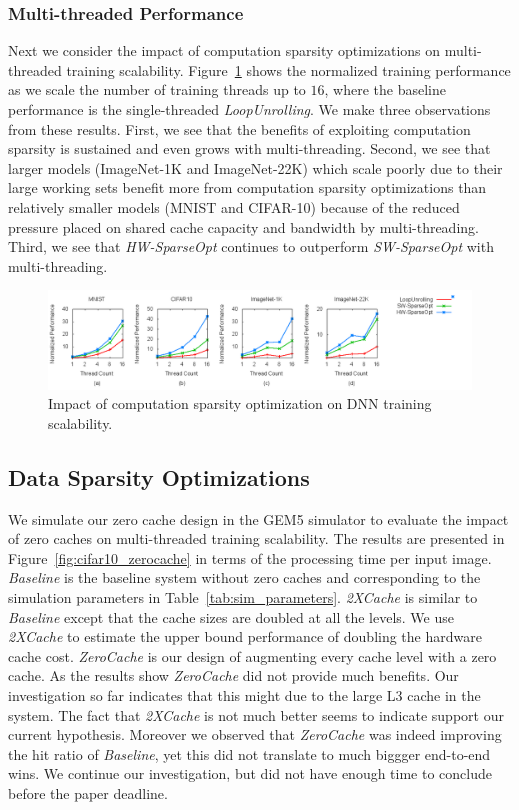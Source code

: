 \subsubsection{Multi-threaded Performance}
Next we consider the impact of computation sparsity optimizations on multi-threaded training scalability.  Figure~\ref{fig:compute_scaling} shows the normalized training performance as we scale the number of training threads up to $16$, where the baseline performance is the single-threaded {\it LoopUnrolling}.   We make three observations from these results.  First, we see that the benefits of exploiting computation sparsity is sustained and even grows with multi-threading.  Second, we see that larger models (ImageNet-1K and ImageNet-22K) which scale poorly due to their large working sets benefit more from computation sparsity optimizations than relatively smaller models (MNIST and CIFAR-10) because of the reduced pressure placed on shared cache capacity and bandwidth by multi-threading.  Third, we see that {\it HW-SparseOpt} continues to outperform {\it SW-SparseOpt} with multi-threading. 

 \begin{figure}
 \centering
 \includegraphics[width=1.95\columnwidth]{Figures/compute_scaling.png}
\caption{Impact of computation sparsity optimization on DNN training scalability.}
 \label{fig:compute_scaling}
 \end{figure}


\subsection{Data Sparsity Optimizations}
\label{subsec:data_sparsity_perf}
We simulate our zero cache design in the GEM5 simulator to evaluate the impact of zero caches on multi-threaded training scalability.  The results are presented in Figure~\ref{fig:cifar10_zerocache} in terms of the processing time per input image.  {\it Baseline} is the baseline system without zero caches and corresponding to the simulation parameters in Table~\ref{tab:sim_parameters}.  {\it 2XCache} is similar to {\it Baseline} except that the cache sizes are doubled at all the levels. We use {\it 2XCache} to estimate the upper bound performance of doubling the hardware cache cost. {\it ZeroCache} is our design of augmenting every cache level with a zero cache. As the results show {\it ZeroCache} did not provide much benefits. Our investigation so far indicates that this might due to the large L3 cache in the system.  The fact that {\it 2XCache} is not much better seems to indicate support our current hypothesis.  Moreover we observed that {\it ZeroCache} was indeed improving the hit ratio of {\it Baseline}, yet this did not translate to much biggger end-to-end wins.  We continue our investigation, but did not have enough time to conclude before the paper deadline. 


